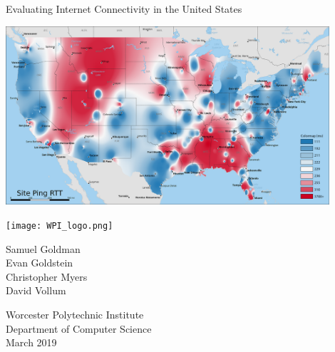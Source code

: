 \noindent\begin{minipage}{0.1\textwidth}
\end{minipage}
\begin{minipage}{0.9\textwidth}
    \begin{center}
        \Huge\noindent Evaluating Internet Connectivity in the United States
        
        \vspace{1.5in}
        \includegraphics[width=0.9\textwidth]{images/siteping/site_ping_rtt_idw.png}
    \end{center}
    \vspace{1in}
    \begin{minipage}{\textwidth}    
        \begin{flushright}
            \texttt{[image: WPI\_logo.png]} 
        \end{flushright}
    \end{minipage}
    \noindent\begin{minipage}{0.5\textwidth}
        \small
        Samuel Goldman \\
        Evan Goldstein \\
        Christopher Myers \\
        David Vollum
    \end{minipage}
    \begin{minipage}{0.5\textwidth}
        \begin{flushright}
            \small
            Worcester Polytechnic Institute \\
            Department of Computer Science\\
            March 2019
        \end{flushright}
    \end{minipage}
\end{minipage}